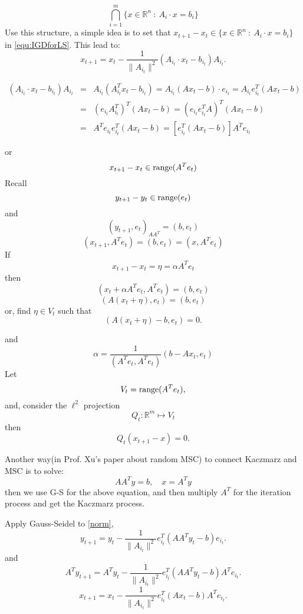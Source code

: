 \begin{equation}
\bigcap_{i=1}^m \{x \in \mathbb{R}^n ~:~ A_i \cdot x = b_i\}
\end{equation}
Use this structure, a simple idea is to set that $x_{t+1} - x_{t} \in  \{x \in \mathbb{R}^n ~:~ A_i \cdot x = b_i\}$ in \ref{equ:IGDforLS}. This lead to:
\begin{equation}\label{equ:KacamarzAlgo}
x_{t+1} = x_t -  \frac{1}{\|A_{i_t}\|^2}(A_{i_t} \cdot x_t - b_{i_t})A_{i_t}. 
\end{equation}

\begin{eqnarray*}
(A_{i_t} \cdot x_t - b_{i_t})A_{i_t}
&=&A_{i_t} (A_{i_t}^T x_t - b_{i_t})
=A_{i_t} (Ax_t -b)\cdot e_{i_t}=A_{i_t} e_{i_t}^T(Ax_t -b)\\
& =& (e_{i_t}A_{i_t}^T)^T(Ax_t -b)
=(e_{i_t}e_{i_t}^TA)^T(Ax_t -b) \\
&=&A^Te_{i_t}e_{i_t}^T(Ax_t -b) 
=[e_{i_t}^T(Ax_t -b)] A^Te_{i_t}
\end{eqnarray*}

or 
$$
x_{t+1} - x_{t} \in  {\rm range}(A^Te_t)
$$
Recall
$$
y_{t+1} - y_{t} \in  {\rm range}(e_t)
$$
and
$$
(y_{t+1} , e_t)_{AA^T} = (b,e_t)
$$
$$
(x_{t+1}, A^Te_t) = (b,e_t)=(x,A^Te_t)
$$
If 
$$
x_{t+1} - x_{t}=\eta=\alpha A^Te_t
$$
then
$$
(x_{t}+\alpha A^Te_t, A^Te_t) = (b,e_t)
$$
$$
(A(x_{t}+\eta), e_t) = (b,e_t)
$$
or, find $\eta\in V_t$ such that 
$$
(A(x_{t}+\eta)-b, e_t) = 0.
$$

and
$$
\alpha=\frac{1}{(A^Te_t, A^Te_t)}(b-Ax_t,e_t)
$$
Let 
$$
V_t={\rm range}(A^Te_t), 
$$
and, consider the $\ell^2$ projection
$$
Q_t:  \mathbb R^m\mapsto V_t
$$
then
$$
Q_t(x_{t+1} - x)=0.
$$

Another way(in Prof. Xu's paper about random MSC) to connect Kaczmarz and MSC is to solve:
\begin{equation}\label{norm}
AA^T y = b,\quad x=A^Ty
\end{equation}
then we use G-S for the above equation, and then multiply $A^T$ for the iteration process and get the Kaczmarz process.

Apply Gauss-Seidel to \eqref{norm}, 
$$
y_{t+1} = y_t -  \frac{1}{\|A_{i_t}\|^2}e_{i_t}^T(AA^Ty_t - b) e_{i_t}. 
$$
and
$$
A^Ty_{t+1} =A^T y_t -  \frac{1}{\|A_{i_t}\|^2}e_{i_t}^T(AA^Ty_t - b) A^Te_{i_t}. 
$$
$$
x_{t+1} =x_t -  \frac{1}{\|A_{i_t}\|^2}e_{i_t}^T(Ax_t - b) A^Te_{i_t}. 
$$

